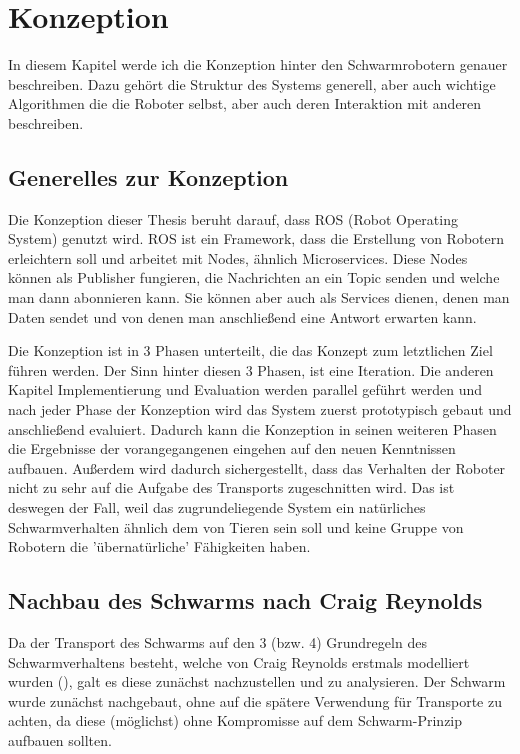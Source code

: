 \chapter{Konzeption}\label{ch:Konzeption}

In diesem Kapitel werde ich die Konzeption hinter den Schwarmrobotern genauer beschreiben. Dazu gehört die Struktur des Systems generell, aber auch wichtige Algorithmen die die Roboter selbst, aber auch deren Interaktion mit anderen beschreiben.

\section{Generelles zur Konzeption}

Die Konzeption dieser Thesis beruht darauf, dass ROS (Robot Operating System) genutzt wird. ROS ist ein Framework, dass die Erstellung von Robotern erleichtern soll und arbeitet mit Nodes, ähnlich Microservices. Diese Nodes können als Publisher fungieren, die Nachrichten an ein Topic senden und welche man dann abonnieren kann. Sie können aber auch als Services dienen, denen man Daten sendet und von denen man anschließend eine Antwort erwarten kann.

Die Konzeption ist in 3 Phasen unterteilt, die das Konzept zum letztlichen Ziel führen werden. Der Sinn hinter diesen 3 Phasen, ist eine Iteration. Die anderen Kapitel Implementierung und Evaluation werden parallel geführt werden und nach jeder Phase der Konzeption wird das System zuerst prototypisch gebaut und anschließend evaluiert. Dadurch kann die Konzeption in seinen weiteren Phasen die Ergebnisse der vorangegangenen eingehen auf den neuen Kenntnissen aufbauen. Außerdem wird dadurch sichergestellt, dass das Verhalten der Roboter nicht zu sehr auf die Aufgabe des Transports zugeschnitten wird. Das ist deswegen der Fall, weil das zugrundeliegende System ein natürliches Schwarmverhalten ähnlich dem von Tieren sein soll und keine Gruppe von Robotern die 'übernatürliche' Fähigkeiten haben.

\section{Nachbau des Schwarms nach Craig Reynolds}
Da der Transport des Schwarms auf den 3 (bzw. 4) Grundregeln des Schwarmverhaltens besteht, welche von Craig Reynolds erstmals modelliert wurden (), galt es diese zunächst nachzustellen und zu analysieren. Der Schwarm wurde zunächst nachgebaut, ohne auf die spätere Verwendung für Transporte zu achten, da diese (möglichst) ohne Kompromisse auf dem Schwarm-Prinzip aufbauen sollten.

